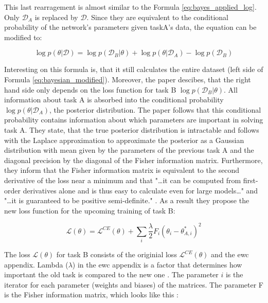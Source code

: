 This last rearragement is almost similar to the Formula \eqref{eq:bayes_applied_log}.
Only $\mathcal{D}_A$ is replaced by $\mathcal{D}$.
Since they are equivalent to the conditional probability of the network's parameters given taskA's data, the equation can be modified to: \cite{elastic-weight-consolidation, schaeffer_ewc}

\begin{equation}
    \log p(\theta | \mathcal{D})=
       \log p(\mathcal{D}_B | \theta)
     + \log p(\theta | \mathcal{D}_A)
     - \log p(\mathcal{D}_B)
    \label{eq:bayesian_modified}
\end{equation}

Interesting on this formula is, that it still calculates the entire dataset (left side of Formula \eqref{eq:bayesian_modified}). Moreover, the paper descibes, that the right hand side only depends on the loss function for task B $\log p(\mathcal{D}_B | \theta)$. All information about task A is absorbed into the conditional probability $\log p(\theta | \mathcal{D}_A)$, the posterior distribution.
The paper follows that this conditional probability contains information about which parameters are important in solving task A.
\cite{elastic-weight-consolidation, schaeffer_ewc}
\newline
They state, that the true posterior distribution is intractable and follows with the Laplace approximation to approximate the posterior as a Gaussian distribution with mean given by the parameters of the previous task A and the diagonal precision by the diagonal of the Fisher information matrix.
\cite{elastic-weight-consolidation}
\newline
Furthermore, they inform that the Fisher information matrix is equivalent to the second derivative of the loss near a minimum and that "…it can be computed from first-order derivatives alone and is thus easy to calculate even for large models…" \cite{elastic-weight-consolidation} and "…it is guaranteed to be positive semi-definite."
\cite{elastic-weight-consolidation}.
\cite{elastic-weight-consolidation, schaeffer_ewc}
\newline
As a result they propose the new loss function for the upcoming training of task B:

\begin{equation}
    \mathcal{L}(\theta) = \mathcal{L}^{CE}(\theta) + \sum_{i} \frac{\lambda}{2} F_{i} (\theta_{i} - \theta_{A,i}^{*})^2
\end{equation}

The loss $\mathcal{L}(\theta)$ for task B consists of the originial loss $\mathcal{L}^{CE}(\theta)$ and the \acrshort{ewc} appendix.
Lambda ($\lambda$) in the \acrshort{ewc} appendix is a factor that determines how important the old task is compared to the new one \cite{elastic-weight-consolidation}.
The parameter $i$ is the iterator for each parameter (weights and biases) of the matrices.
The parameter F is the Fisher information matrix, which looks like this \cite{incremental-moment-matching}:

